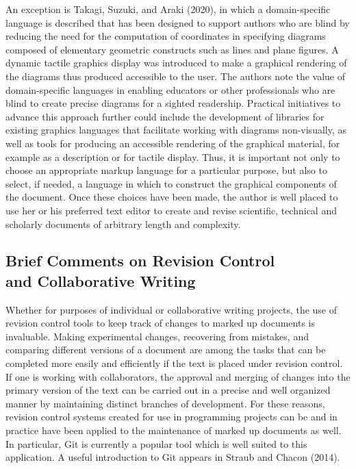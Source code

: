 \documentclass[11pt]{sig-alternate}
\begin{document}
\begin{large}
An exception is Takagi, Suzuki, and Araki (2020), in which a domain-specific language is described that has been designed to support authors who are blind by reducing the need for the computation of coordinates in specifying diagrams composed of elementary geometric constructs such as lines and plane figures. A dynamic tactile graphics display was introduced to make a graphical rendering of the diagrams thus produced accessible to the user. The authors note the value of domain-specific languages in enabling educators or other professionals who are blind to create precise diagrams for a sighted readership. Practical initiatives to advance this approach further could include the development of libraries for existing graphics languages that facilitate working with diagrams non-visually, as well as tools for producing an accessible rendering of the graphical material, for example as a description or for tactile display. Thus, it is important not only to choose an appropriate markup language for a particular purpose, but also to select, if needed, a language in which to construct the graphical components of the document. Once these choices have been made, the author is well placed to use her or his preferred text editor to create and revise scientific, technical and scholarly documents of arbitrary length and complexity.

\subsection*{Brief Comments on Revision Control \\and Collaborative Writing}
Whether for purposes of individual or collaborative writing projects, the use of revision control tools to keep track of changes to marked up documents is invaluable. Making experimental changes, recovering from mistakes, and comparing different versions of a document are among the tasks that can be completed more easily and efficiently if the text is placed under revision control. If one is working with collaborators, the approval and merging of changes into the primary version of the text can be carried out in a precise and well organized manner by maintaining distinct branches of development. For these reasons, revision control systems created for use in programming projects can be and in practice have been applied to the maintenance of marked up documents as well. In particular, Git is currently a popular tool which is well suited to this application. A useful introduction to Git appears in Straub and Chacon (2014).


\end{large}
\end{document}
